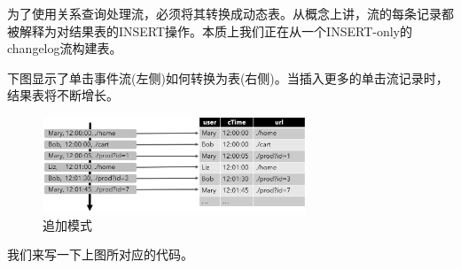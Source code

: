 \documentclass[cn,11pt,chinese]{elegantbook}
\begin{document}
为了使用关系查询处理流，必须将其转换成动态表。从概念上讲，流的每条记录都被解释为对结果表的INSERT操作。本质上我们正在从一个INSERT-only的changelog流构建表。

下图显示了单击事件流(左侧)如何转换为表(右侧)。当插入更多的单击流记录时，结果表将不断增长。

\begin{figure}[htbp]
    \centering
    \includegraphics[width=0.7\textwidth]{images/append-mode.png}
    \caption{追加模式}
\end{figure}

我们来写一下上图所对应的代码。
\end{document}
